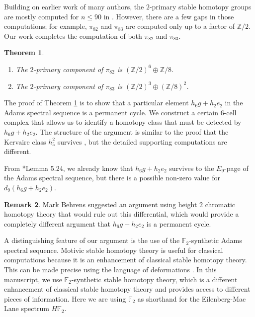 \documentclass{amsart}
\newtheorem{thm}{Theorem}[section]
\theoremstyle{definition}
\newtheorem{rmk}[thm]{Remark}
\newcommand{\F}{\mathbb{F}}
\newcommand{\Z}{\mathbb{Z}}
\begin{document}
Building on earlier work of many authors, 
the $2$-primary stable homotopy groups are mostly computed 
for $n \leq 90$ in \cite{IWX} \cite{IWX20a}.  However, there are a few 
gaps in those computations; for example,
$\pi_{82}$ and $\pi_{83}$ are computed only 
up to a factor of $\Z/2$.
Our work completes the computation of
both $\pi_{82}$ and $\pi_{83}$.

\begin{thm}
\label{thm:82-83}
\mbox{}
\begin{enumerate}
\item
The $2$-primary component of $\pi_{82}$ is
$(\Z/2)^6 \oplus \Z/8$.
\item
The $2$-primary component of $\pi_{83}$ is $(\Z/2)^3 \oplus (\Z/8)^2$.
\end{enumerate}
\end{thm}

The proof of Theorem \ref{thm:82-83} is to show that a particular
element $h_6 g + h_2 e_2$ in the Adams spectral sequence is a 
permanent cycle.  
We construct a certain 6-cell complex that allows us to
identify a homotopy class that must be detected by $h_6 g + h_2 e_2$.
The structure of the argument is similar to the proof that the
Kervaire class $h_5^2$ survives \cite{BJM}, but the detailed supporting
computations are different.

From \cite{IWX}*{Lemma 5.24}, we already know that $h_6 g + h_2 e_2$ survives to the
$E_9$-page of the Adams spectral sequence, but there is a possible
non-zero value for $d_9(h_6 g + h_2 e_2)$.

\begin{rmk}
  Mark Behrens suggested an argument using height $2$ chromatic
  homotopy theory that would rule out this differential, which
  would provide
  a completely different argument that $h_6 g + h_2 e_2$ is a 
  permanent cycle.
\end{rmk}


A distinguishing feature of our argument is the use of the
$\F_2$-synthetic Adams spectral sequence.
Motivic stable homotopy theory is useful for classical computations because it is an enhancement of classical stable homotopy theory.  This can be made precise using the language of deformations \cite{GWX17} \cite{GIKR18}  \cite{Pstragowski18}.  
In this manuscript, we use $\F_2$-synthetic stable
homotopy theory, which is a different enhancement of classical stable homotopy theory and provides access to different pieces of information.
Here we are using $\F_2$ as shorthand for the
Eilenberg-Mac Lane spectrum $H\F_2$.
\end{document}
